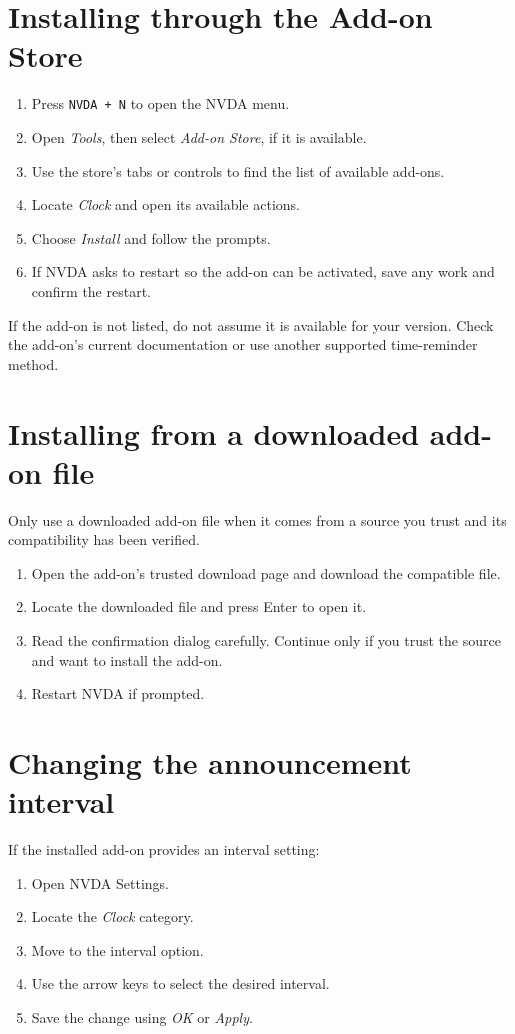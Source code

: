 \documentclass[11pt,oneside]{book}
\begin{document}
\section{Installing through the Add-on Store}
\begin{enumerate}
	\item Press \texttt{NVDA + N} to open the NVDA menu.
	\item Open \textit{Tools}, then select \textit{Add-on Store}, if it is available.
	\item Use the store's tabs or controls to find the list of available add-ons.
	\item Locate \textit{Clock} and open its available actions.
	\item Choose \textit{Install} and follow the prompts.
	\item If NVDA asks to restart so the add-on can be activated, save any work and confirm the restart.
\end{enumerate}
If the add-on is not listed, do not assume it is available for your version. Check the add-on's current documentation or use another supported time-reminder method.

\section{Installing from a downloaded add-on file}
Only use a downloaded add-on file when it comes from a source you trust and its compatibility has been verified.
\begin{enumerate}
	\item Open the add-on's trusted download page and download the compatible file.
	\item Locate the downloaded file and press Enter to open it.
	\item Read the confirmation dialog carefully. Continue only if you trust the source and want to install the add-on.
	\item Restart NVDA if prompted.
\end{enumerate}

\section{Changing the announcement interval}
If the installed add-on provides an interval setting:
\begin{enumerate}
	\item Open NVDA Settings.
	\item Locate the \textit{Clock} category.
	\item Move to the interval option.
	\item Use the arrow keys to select the desired interval.
	\item Save the change using \textit{OK} or \textit{Apply}.
\end{enumerate}
\end{document}
